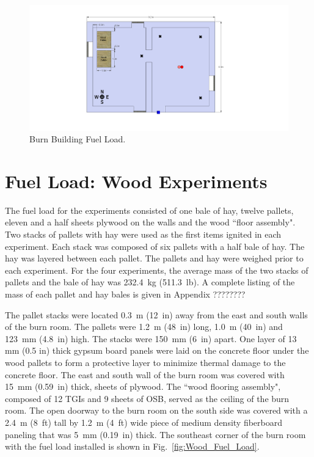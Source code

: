 \documentclass[12pt,oneside]{book}
\begin{document}
\begin{figure}[!ht]
	\includegraphics[width=6in]{../Figures/Pictures/DelCoBurnBuildingFuelLoad}
	\caption{Burn Building Fuel Load.}
	\label{fig:Burn_Building_Fuel_Load}
\end{figure}

\section{Fuel Load: Wood Experiments}
\label{sec:Fuel_Load:_Wood_Experiments} 

The fuel load for the experiments consisted of one bale of hay, twelve pallets, eleven and a half sheets plywood on the walls and the wood ``floor assembly". Two stacks of pallets with hay were used as the first items ignited in each experiment.  Each stack was composed of six pallets with a half bale of hay.  The hay was layered between each pallet.  The pallets and hay were weighed prior to each experiment.  For the four experiments, the average mass of the two stacks of pallets and the bale of hay was 232.4~kg (511.3~lb).  A complete listing of the mass of each pallet and hay bales is given in Appendix ????????
  
The pallet stacks were located 0.3~m (12~in) away from the east and south walls of the burn room.  The pallets were 1.2~m (48~in) long, 1.0~m (40~in) and 123~mm (4.8~in) high.  The stacks were 150~mm (6~in) apart.  One layer of 13 mm (0.5 in) thick gypsum board panels were laid on the concrete floor under the wood pallets to form a protective layer to minimize thermal damage to the concrete floor.
The east and south wall of the burn room was covered with 15~mm (0.59~in) thick, sheets of plywood.  The ``wood flooring assembly", composed of 12 TGIs and 9 sheets of OSB, served as the ceiling of the burn room.  The open doorway to the burn room on the south side was covered with a 2.4~m (8~ft) tall by 1.2~m (4~ft) wide piece of medium density fiberboard paneling that was 5~mm (0.19~in) thick.  The southeast corner of the burn room with the fuel load installed is shown in Fig.~\ref{fig:Wood_Fuel_Load}.
\end{document}

